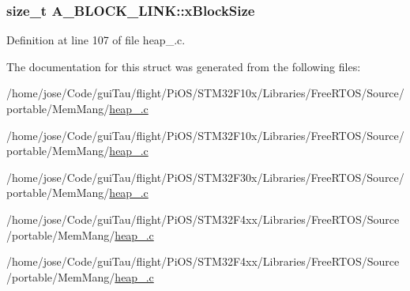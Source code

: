 \hypertarget{struct_a___b_l_o_c_k___l_i_n_k_ad5dcf5df03d8be6186c567be9e2c657b}{
\subsubsection[{x\-Block\-Size}]{\setlength{\rightskip}{0pt plus 5cm}size\-\_\-t A\-\_\-\-B\-L\-O\-C\-K\-\_\-\-L\-I\-N\-K\-::x\-Block\-Size}}\label{struct_a___b_l_o_c_k___l_i_n_k_ad5dcf5df03d8be6186c567be9e2c657b}


Definition at line 107 of file heap\-\_.\-c.



The documentation for this struct was generated from the following files\-:\begin{DoxyCompactItemize}
\item 
/home/jose/\-Code/gui\-Tau/flight/\-Pi\-O\-S/\-S\-T\-M32\-F10x/\-Libraries/\-Free\-R\-T\-O\-S/\-Source/portable/\-Mem\-Mang/\hyperlink{_s_t_m32_f10x_2_libraries_2_free_r_t_o_s_2_source_2portable_2_mem_mang_2heap__2_8c}{heap\-\_.\-c}\item 
/home/jose/\-Code/gui\-Tau/flight/\-Pi\-O\-S/\-S\-T\-M32\-F10x/\-Libraries/\-Free\-R\-T\-O\-S/\-Source/portable/\-Mem\-Mang/\hyperlink{_s_t_m32_f10x_2_libraries_2_free_r_t_o_s_2_source_2portable_2_mem_mang_2heap__4_8c}{heap\-\_.\-c}\item 
/home/jose/\-Code/gui\-Tau/flight/\-Pi\-O\-S/\-S\-T\-M32\-F30x/\-Libraries/\-Free\-R\-T\-O\-S/\-Source/portable/\-Mem\-Mang/\hyperlink{_s_t_m32_f30x_2_libraries_2_free_r_t_o_s_2_source_2portable_2_mem_mang_2heap__2_8c}{heap\-\_.\-c}\item 
/home/jose/\-Code/gui\-Tau/flight/\-Pi\-O\-S/\-S\-T\-M32\-F4xx/\-Libraries/\-Free\-R\-T\-O\-S/\-Source/portable/\-Mem\-Mang/\hyperlink{_s_t_m32_f4xx_2_libraries_2_free_r_t_o_s_2_source_2portable_2_mem_mang_2heap__2_8c}{heap\-\_.\-c}\item 
/home/jose/\-Code/gui\-Tau/flight/\-Pi\-O\-S/\-S\-T\-M32\-F4xx/\-Libraries/\-Free\-R\-T\-O\-S/\-Source/portable/\-Mem\-Mang/\hyperlink{_s_t_m32_f4xx_2_libraries_2_free_r_t_o_s_2_source_2portable_2_mem_mang_2heap__4_8c}{heap\-\_.\-c}\end{DoxyCompactItemize}
